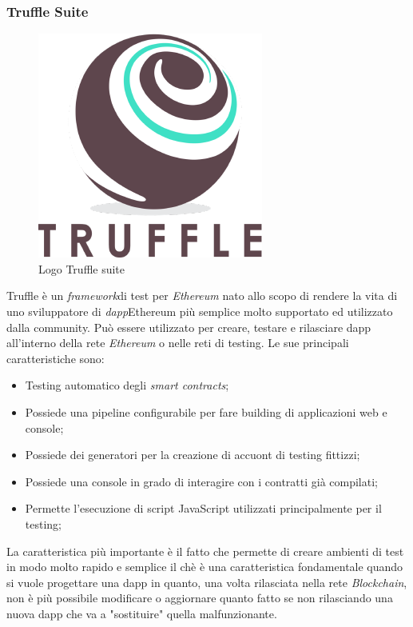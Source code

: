 \subsubsection{Truffle Suite}
\begin{figure}[h]
	\centering
	\includegraphics[scale=0.3]{immagini/truffle}
	\caption{Logo Truffle suite}
\end{figure}
Truffle è un \emph{\gls{framework}}\glsfirstoccur di test per \textit{Ethereum} nato allo scopo di rendere la vita di uno sviluppatore di \emph{\gls{dapp}}\glsfirstoccur Ethereum più semplice molto supportato ed utilizzato dalla community.
Può essere utilizzato per creare, testare e rilasciare \gls{dapp} all'interno della rete \textit{Ethereum} o nelle reti di testing\cite{truffle}.
Le sue principali caratteristiche sono:
\begin{itemize}
	\item Testing automatico degli \textit{smart contracts};
	\item Possiede una pipeline configurabile per fare building di applicazioni web e console;
	\item Possiede dei generatori per la creazione di accuont di testing fittizzi;
	\item Possiede una console in grado di interagire con i contratti già compilati;
	\item Permette l'esecuzione di script JavaScript utilizzati principalmente per il testing;
\end{itemize}
La caratteristica più importante è il fatto che permette di creare ambienti di test in modo molto rapido e semplice il chè è una caratteristica fondamentale quando si vuole progettare una \gls{dapp} in quanto, una volta rilasciata nella rete \textit{Blockchain}, non è più possibile modificare o aggiornare quanto fatto se non rilasciando una nuova \gls{dapp} che va a "sostituire" quella malfunzionante\cite{truffle}.
